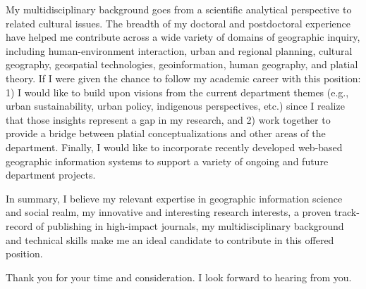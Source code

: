 \documentclass[11pt, a4paper]{awesome-cv}
\begin{document}
\begin{cvletter}
My multidisciplinary background goes from a scientific analytical perspective to related cultural issues. The breadth of my doctoral and postdoctoral experience have helped me contribute across a wide variety of domains of geographic inquiry, including human-environment interaction, urban and regional planning, cultural geography, geospatial technologies, geoinformation, human geography, and platial theory. If I were given the chance to follow my academic career with this position: 1) I would like to build upon visions from the current department themes (e.g., urban sustainability, urban policy, indigenous perspectives, etc.) since I realize that those insights represent a gap in my research, and 2) work together to provide a bridge between platial conceptualizations and other areas of the department. Finally, I would like to incorporate recently developed web-based geographic information systems to support a variety of ongoing and future department projects.\par

In summary, I believe my relevant expertise in geographic information science and social realm, my innovative and interesting research interests, a proven track-record of publishing in high-impact journals, my multidisciplinary background and technical skills make me an ideal candidate to contribute in this offered position.\par

Thank you for your time and consideration. I look forward to hearing from you.\par


\end{cvletter}


\makeletterclosing
\end{document}
